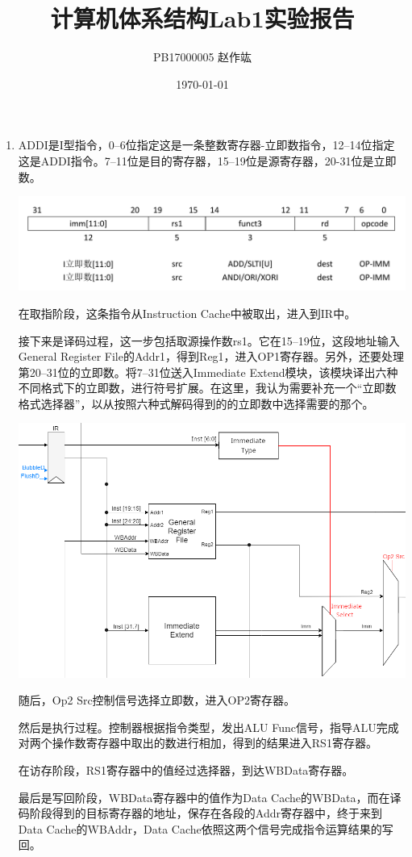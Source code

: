 \documentclass[UTF8,zihao=-4]{ctexart}
\title{\heiti 计算机体系结构\quad Lab1实验报告}
\author{PB17000005\quad \CJKfontspec{AR PL UKai CN} 赵作竑}
\date{\kaishu \today}
\begin{document}
	\maketitle
	\begin{enumerate}
		\item ADDI是I型指令，0--6位指定这是一条整数寄存器-立即数指令，12--14位指定这是ADDI指令。7--11位是目的寄存器，15--19位是源寄存器，20-31位是立即数。
		\begin{center}
		\includegraphics[width=0.8\linewidth]{addi}
		\end{center}
		在取指阶段，这条指令从Instruction Cache中被取出，进入到IR中。
		
		接下来是译码过程，这一步包括取源操作数rs1。它在15--19位，这段地址输入General Register File的Addr1，得到Reg1，进入OP1寄存器。另外，还要处理第20--31位的立即数。将7--31位送入Immediate Extend模块，该模块译出六种不同格式下的立即数，进行符号扩展。在这里，我认为需要补充一个``立即数格式选择器''，以从按照六种式解码得到的的立即数中选择需要的那个。
		\begin{center}
		\includegraphics[width=0.8\linewidth]{imm_select_patch}
		\end{center}
		随后，Op2 Src控制信号选择立即数，进入OP2寄存器。
		
		然后是执行过程。控制器根据指令类型，发出ALU Func信号，指导ALU完成对两个操作数寄存器中取出的数进行相加，得到的结果进入RS1寄存器。
		
		在访存阶段，RS1寄存器中的值经过选择器，到达WBData寄存器。
		
		最后是写回阶段，WBData寄存器中的值作为Data Cache的WBData，而在译码阶段得到的目标寄存器的地址，保存在各段的Addr寄存器中，终于来到Data Cache的WBAddr，Data Cache依照这两个信号完成指令运算结果的写回。
		

\end{enumerate}
\end{document}
